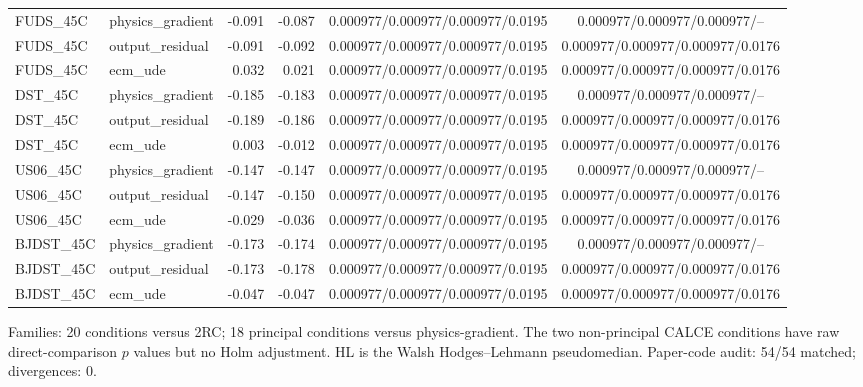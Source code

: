\begin{table}[!t]
\begin{tabular}{llrrcc}
FUDS\_45C & physics\_gradient & -0.091 & -0.087 & 0.000977/0.000977/0.000977/0.0195 & 0.000977/0.000977/0.000977/-- \\
FUDS\_45C & output\_residual & -0.091 & -0.092 & 0.000977/0.000977/0.000977/0.0195 & 0.000977/0.000977/0.000977/0.0176 \\
FUDS\_45C & ecm\_ude & 0.032 & 0.021 & 0.000977/0.000977/0.000977/0.0195 & 0.000977/0.000977/0.000977/0.0176 \\
DST\_45C & physics\_gradient & -0.185 & -0.183 & 0.000977/0.000977/0.000977/0.0195 & 0.000977/0.000977/0.000977/-- \\
DST\_45C & output\_residual & -0.189 & -0.186 & 0.000977/0.000977/0.000977/0.0195 & 0.000977/0.000977/0.000977/0.0176 \\
DST\_45C & ecm\_ude & 0.003 & -0.012 & 0.000977/0.000977/0.000977/0.0195 & 0.000977/0.000977/0.000977/0.0176 \\
US06\_45C & physics\_gradient & -0.147 & -0.147 & 0.000977/0.000977/0.000977/0.0195 & 0.000977/0.000977/0.000977/-- \\
US06\_45C & output\_residual & -0.147 & -0.150 & 0.000977/0.000977/0.000977/0.0195 & 0.000977/0.000977/0.000977/0.0176 \\
US06\_45C & ecm\_ude & -0.029 & -0.036 & 0.000977/0.000977/0.000977/0.0195 & 0.000977/0.000977/0.000977/0.0176 \\
BJDST\_45C & physics\_gradient & -0.173 & -0.174 & 0.000977/0.000977/0.000977/0.0195 & 0.000977/0.000977/0.000977/-- \\
BJDST\_45C & output\_residual & -0.173 & -0.178 & 0.000977/0.000977/0.000977/0.0195 & 0.000977/0.000977/0.000977/0.0176 \\
BJDST\_45C & ecm\_ude & -0.047 & -0.047 & 0.000977/0.000977/0.000977/0.0195 & 0.000977/0.000977/0.000977/0.0176 \\
\bottomrule
\end{tabular}
\par\smallskip\begin{minipage}{0.98\textwidth}\footnotesize Families: 20 conditions versus 2RC; 18 principal conditions versus physics-gradient. The two non-principal CALCE conditions have raw direct-comparison $p$ values but no Holm adjustment. HL is the Walsh Hodges--Lehmann pseudomedian. Paper-code audit: 54/54 matched; divergences: 0.\end{minipage}
\end{table}

